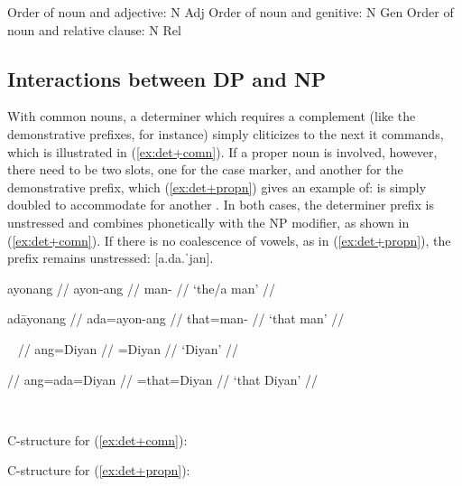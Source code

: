 \pex
\a Order of noun and adjective: N Adj
\a Order of noun and genitive: N Gen
\a Order of noun and relative clause: N Rel
\xe

\subsection{Interactions between DP and NP}
\label{subsec:dpnpinteract}

With common nouns, a determiner which requires a complement (like the
demonstrative prefixes, for instance) simply cliticizes to the next 
it commands, which is illustrated in (\ref{ex:det+comn}). If a proper noun is
involved, however, there need to be two  slots, one for the case
marker, and another for the demonstrative prefix, which (\ref{ex:det+propn})
gives an example of:  is simply doubled to accommodate for another
. %
In both cases, the determiner prefix is unstressed and combines 
phonetically with the NP modifier, as shown in (\ref{ex:det+comn}). If there is
no coalescence of vowels, as in (\ref{ex:det+propn}), the prefix remains
unstressed:  [a.da.ˈjan].

\begin{multicols}{2}
\pex\label{ex:det+comn}
\a\begingl
	\gla ayonang //
	\glb ayon-ang //
	\glc man-\Aarg{} //
	\glft `the/a man' //
\endgl

\a\begingl
	\gla adāyonang //
	\glb ada=ayon-ang //
	\glc that=man-\Aarg{} //
	\glft `that man' //
\endgl

\xe

\pex~\label{ex:det+propn}
\a\begingl
	 //
	\glb ang=Diyan //
	\glc \Aarg{}=Diyan //
	\glft `Diyan' //
\endgl

\a\label{ex:case+det+propn}\begingl
	 //
	\glb ang=ada=Diyan //
	\glc \Aarg{}=that=Diyan //
	\glft `that Diyan' //
\endgl

\xe

\end{multicols}

\begin{multicols}{2}
\pex~
\a \begin{minipage}[t]{\linewidth}
C-structure for (\ref{ex:det+comn}):\medskip

\end{minipage}

\a \begin{minipage}[t]{\linewidth}
C-structure for (\ref{ex:det+propn}):\medskip

\end{minipage}
\xe
\end{multicols}

